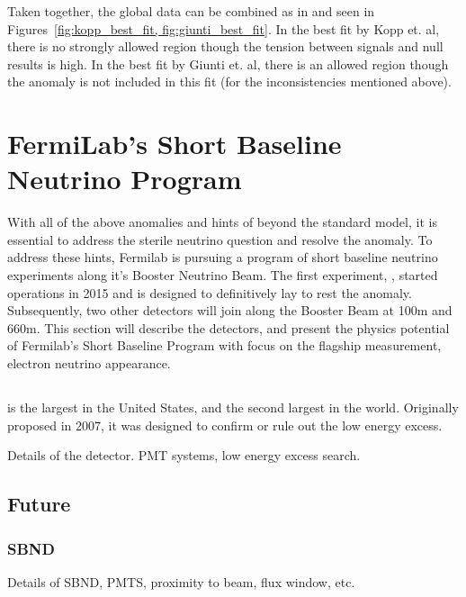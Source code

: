 Taken together, the global data can be combined as in \cite{kopp_best_fit,giunti_best_fit} and seen in Figures~\ref{fig:kopp_best_fit, fig:giunti_best_fit}.  In the best fit by Kopp et. al, there is no strongly allowed region though the tension between signals and null results is high.  In the best fit by Giunti et. al, there is an allowed region though the \MB anomaly is not included in this fit (for the inconsistencies mentioned above).


\section{FermiLab's Short Baseline Neutrino Program}

\label{sec:sbn_detectors}
With all of the above anomalies and hints of beyond the standard model, it is essential to address the sterile neutrino question and resolve the \MB anomaly.  To address these hints, Fermilab is pursuing a program of short baseline neutrino experiments along it's Booster Neutrino Beam.  The first experiment, \uboone, started operations in 2015 and is designed to definitively lay to rest the \MB anomaly.  Subsequently, two other detectors will join \uboone along the Booster Beam at 100m and 660m.  This section will describe the detectors, and present the physics potential of Fermilab's Short Baseline Program with focus on the flagship measurement, electron neutrino appearance.

\subsection{\uboone}

\uboone is the largest \lartpc in the United States, and the second largest in the world.  Originally proposed in 2007, it was designed to confirm or rule out the \MB low energy excess.

Details of the \uboone detector.  PMT systems, low energy excess search.

\subsection{Future \lartpcs}

\subsubsection{SBND}

Details of SBND, PMTS, proximity to beam, flux window, etc.

